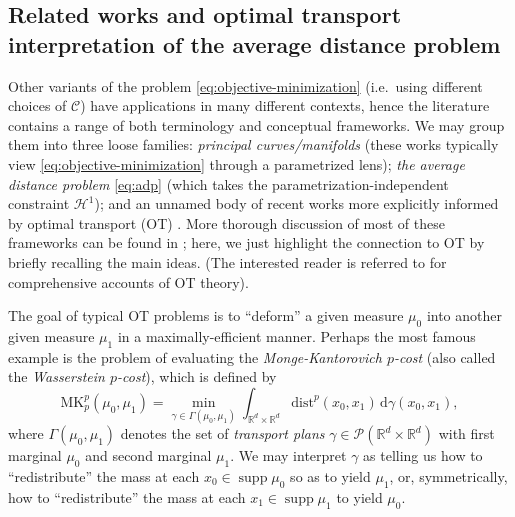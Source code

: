 \documentclass[preprint, reqno]{amsart}
\DeclareMathOperator*{\supp}{supp}
\newcommand{\dist}{\mathrm{dist}}
\theoremstyle{definition}
\numberwithin{equation}{section}
\begin{document}
\subsection{Related works and optimal transport interpretation of the
  average distance problem}
\label{sec:related-works}

Other variants of the problem \eqref{eq:objective-minimization} (i.e.\
using different choices of $\mathscr C$) have applications in many
different contexts, hence the literature contains a range of both
terminology and conceptual frameworks. We may group them into three
loose families: \emph{principal curves/manifolds}
\cites{hastie1984,hastie1989,kegl1998,kegl2000,ozertem2008,gerber2009,biau2011,Kirov16,Lu2016Apr,Delattre17,Lu2020,Warren2025May}
(these works typically view \eqref{eq:objective-minimization} through
a parametrized lens); \emph{the average distance problem}
\eqref{eq:adp}
\cites{Buttazzo02,Buttazzo03,Stepanov04,Stepanov06,Buttazzo09,Lemenant12}
(which takes the parametrization-independent constraint $\mathcal
H^1$); and an unnamed body of recent works more explicitly informed by
optimal transport (OT)
\cites{Chauffert2017Feb,Lebrat2019Apr,Chambolle2023Apr,Kobayashi24}.
More thorough discussion of most of these frameworks can be found in
\cite{Kobayashi24}; here, we just highlight the connection to OT by
briefly recalling the main ideas. (The interested reader is referred
to \cites{Villani09, Santambrogio15, cuturi-peyre2020} for
comprehensive accounts of OT theory).

The goal of typical OT problems is to ``deform'' a given measure
$\mu_0$ into another given measure $\mu_1$ in a maximally-efficient
manner. Perhaps the most famous example is the problem of evaluating
the \emph{Monge-Kantorovich $p$-cost} (also called the
\emph{Wasserstein $p$-cost}), which is defined by
\begin{equation}
  \mathrm{MK}_p^p(\mu_0,\mu_1) = \min_{\gamma \in
    \Gamma(\mu_0,\mu_1)} \int_{\mathbb R^d \times \mathbb R^d}
  \dist^p(x_0,x_1) \, \mathrm{d}\gamma(x_0,x_1), \label{eq:mk-cost}
\end{equation}
where $\Gamma(\mu_0,\mu_1)$ denotes the set of \emph{transport
  plans} $\gamma \in \mathcal P(\mathbb R^d\times \mathbb R^d)$ with
first marginal $\mu_0$ and second marginal $\mu_1$. We may interpret
$\gamma$ as telling us how to ``redistribute'' the mass at each $x_0
\in \supp \mu_0$ so as to yield $\mu_1$, or, symmetrically, how to
``redistribute'' the mass at each $x_1 \in \supp \mu_1$ to yield
$\mu_0$.
\end{document}
